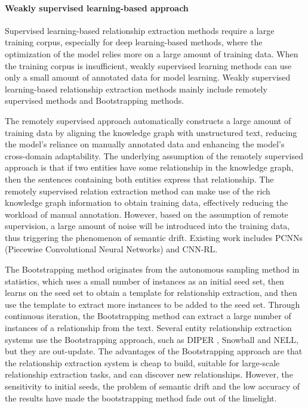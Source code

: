 \documentclass[%
 aip,
 jmp,%
 amsmath,amssymb,
 reprint,%
]{revtex4-2}
\begin{document}
\paragraph{Weakly supervised learning-based approach}
Supervised learning-based relationship extraction methods require a large training corpus\cite{chang2013tempting}, especially for deep learning-based methods, where the optimization of the model relies more on a large amount of training data. When the training corpus is insufficient, weakly supervised learning methods can use only a small amount of annotated data for model learning. Weakly supervised learning-based relationship extraction methods mainly include remotely supervised methods and Bootstrapping methods\cite{banea2008bootstrapping}.

The remotely supervised approach\cite{townshend1981information} automatically constructs a large amount of training data by aligning the knowledge graph with unstructured text, reducing the model's reliance on manually annotated data and enhancing the model's cross-domain adaptability. The underlying assumption of the remotely supervised approach is that if two entities have some relationship in the knowledge graph, then the sentences containing both entities express that relationship. The remotely supervised relation extraction method can make use of the rich knowledge graph information to obtain training data, effectively reducing the workload of manual annotation\cite{zhang2022reducing}. However, based on the assumption of remote supervision, a large amount of noise will be introduced into the training data, thus triggering the phenomenon of semantic drift\cite{jatowt2014framework}. Existing work includes PCNNs (Piecewise Convolutional Neural Networks) \cite{ji2008mixed} and CNN-RL\cite{wen2020new}.

The Bootstrapping method originates from the autonomous sampling method in statistics, 
which uses a small number of instances as an initial seed set, then learns on the seed set 
to obtain a template for relationship extraction, and then use the template to extract more instances to be added to the seed set. Through continuous iteration, the Bootstrapping method can extract a large number of instances of a relationship from the text\cite{gupta2018joint}. Several entity relationship extraction systems use the Bootstrapping approach, such as DIPER \cite{gallet2015diuretic}, Snowball \cite{agichtein2000snowball} and NELL, but they are out-update. 
The advantages of the Bootstrapping approach are that the relationship extraction system is cheap to build, suitable for large-scale relationship extraction tasks, and can discover new relationships. 
However, the sensitivity to initial seeds, the problem of semantic drift and the low accuracy of the results have made the bootstrapping method fade out of the limelight.
\end{document}
